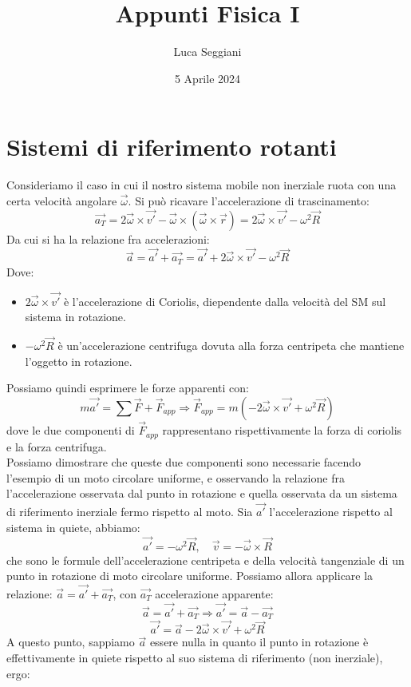 \documentclass[a4paper,12pt]{article}
\title{Appunti Fisica I}
\author{Luca Seggiani}
\date{5 Aprile 2024}
\begin{document}
\maketitle
\section{Sistemi di riferimento rotanti}
Consideriamo il caso in cui il nostro sistema mobile non inerziale ruota con una certa velocità
angolare $\vec{\omega}$. Si può ricavare l'accelerazione di trascinamento:
$$ \vec{a_T} = 2\vec{\omega} \times \vec{v'} - \vec{\omega} \times (\vec{\omega} \times \vec{r}) 
= 2\vec{\omega} \times  \vec{v'} - \omega^2\vec{R} $$
Da cui si ha la relazione fra accelerazioni:
$$ \vec{a} = \vec{a'} + \vec{a_T} = \vec{a'} + 2\vec{\omega} \times \vec{v'} - \omega^2 \vec{R}$$
Dove: 
\begin{itemize}
  \item $2\vec{\omega} \times \vec{v'}$ è l'accelerazione di Coriolis, diependente dalla velocità del SM
    sul sistema in rotazione.
  \item $-\omega^2 \vec{R}$ è un'accelerazione centrifuga dovuta alla forza centripeta che mantiene l'oggetto
    in rotazione.
\end{itemize}
Possiamo quindi esprimere le forze apparenti con:
$$ m\vec{a'} = \sum \vec{F} + \vec{F}_{app} \Rightarrow \vec{F}_{app} = m(-2\vec{\omega} \times \vec{v'} + \omega^2\vec{R}) $$
dove le due componenti di $\vec{F}_{app}$ rappresentano rispettivamente la forza di coriolis e la forza centrifuga. \\
Possiamo dimostrare che queste due componenti sono necessarie facendo l'esempio di un moto circolare uniforme, e osservando
la relazione fra l'accelerazione osservata dal punto in rotazione e quella osservata da un sistema di riferimento inerziale
fermo rispetto al moto. Sia $\vec{a'}$ l'accelerazione rispetto al sistema in quiete, abbiamo:
$$ \vec{a'} = -\omega^2\vec{R}, \quad \vec{v} = -\vec{\omega} \times \vec{R} $$
che sono le formule dell'accelerazione centripeta e della velocità tangenziale di un punto in rotazione di moto
circolare uniforme. Possiamo allora applicare la relazione: $\vec{a} = \vec{a'} + \vec{a_T}$, con $\vec{a_T}$ accelerazione apparente:
$$ \vec{a} = \vec{a'} + \vec{a_T} \Rightarrow \vec{a'} = \vec{a} - \vec{a_T}$$
$$ \vec{a'} = \vec{a} - 2\vec{\omega} \times \vec{v'} + \omega^2\vec{R} $$
A questo punto, sappiamo $\vec{a}$ essere nulla in quanto il punto in rotazione è effettivamente in quiete rispetto
al suo sistema di riferimento (non inerziale), ergo:
\end{document}
